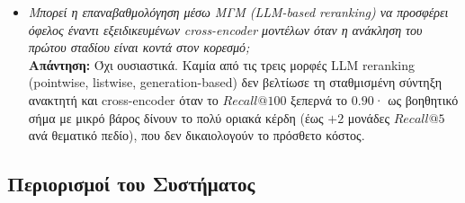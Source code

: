 \begin{itemize}
    \item[\textbf{RQ4:}] \textit{Μπορεί η επαναβαθμολόγηση μέσω ΜΓΜ (LLM-based reranking) να προσφέρει όφελος έναντι εξειδικευμένων cross-encoder μοντέλων όταν η ανάκληση του πρώτου σταδίου είναι κοντά στον κορεσμό;} \\
    \textbf{Απάντηση:} Όχι ουσιαστικά. Καμία από τις τρεις μορφές LLM reranking (pointwise, listwise, generation-based) δεν βελτίωσε τη σταθμισμένη σύντηξη ανακτητή και cross-encoder όταν το $Recall@100$ ξεπερνά το $0.90$· ως βοηθητικό σήμα με μικρό βάρος δίνουν το πολύ οριακά κέρδη (έως $+2$ μονάδες $Recall@5$ ανά θεματικό πεδίο), που δεν δικαιολογούν το πρόσθετο κόστος.
\end{itemize}

\subsection{Περιορισμοί του Συστήματος}

